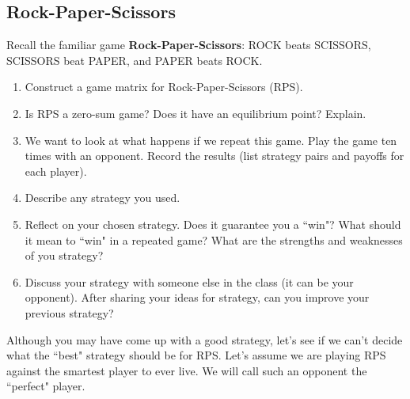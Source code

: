 
\subsection{Rock-Paper-Scissors}


\vspace{.1in}


Recall the familiar game {\bf Rock-Paper-Scissors}: ROCK beats SCISSORS, SCISSORS beat PAPER, and PAPER beats ROCK.

\begin{enumerate}
\item Construct a game matrix for Rock-Paper-Scissors (RPS).
\vspace{.1in}

\item Is RPS a zero-sum game? Does it have an equilibrium point? Explain.
\vspace{.1 in}

\item We want to look at what happens if we repeat this game. Play the game ten times with an opponent. Record the results (list strategy pairs and payoffs for each player).

\item Describe any strategy you used.
\vspace{.1 in}

\item Reflect on your chosen strategy. Does it guarantee you a ``win"? What should it mean to ``win" in a repeated game? What are the strengths and weaknesses of you strategy? 
\vspace{.1 in}

\item Discuss your strategy with someone else in the class (it can be your opponent). After sharing your ideas for strategy, can you improve your previous strategy?
\vspace{.1 in}

\end{enumerate}
\noindent
Although you may have come up with a good strategy, let's see if we can't decide what the ``best" strategy should be for RPS. Let's assume we are playing RPS against the smartest player to ever live. We will call such an opponent the ``perfect" player.
\vspace{.1in}


